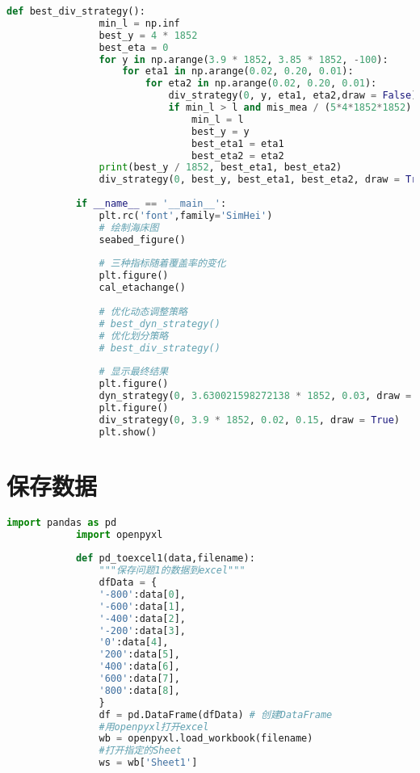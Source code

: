 \documentclass[withoutpreface,bwprint]{cumcmthesis} %
\begin{document}
\begin{appendices}
\begin{lstlisting}[language=python]
            def best_div_strategy():
                min_l = np.inf
                best_y = 4 * 1852
                best_eta = 0
                for y in np.arange(3.9 * 1852, 3.85 * 1852, -100):
                    for eta1 in np.arange(0.02, 0.20, 0.01):
                        for eta2 in np.arange(0.02, 0.20, 0.01):
                            div_strategy(0, y, eta1, eta2,draw = False)
                            if min_l > l and mis_mea / (5*4*1852*1852) < 0.05:
                                min_l = l
                                best_y = y
                                best_eta1 = eta1
                                best_eta2 = eta2
                print(best_y / 1852, best_eta1, best_eta2)
                div_strategy(0, best_y, best_eta1, best_eta2, draw = True)
            
            if __name__ == '__main__':
                plt.rc('font',family='SimHei')
                # 绘制海床图
                seabed_figure()
                
                # 三种指标随着覆盖率的变化
                plt.figure()
                cal_etachange()
            
                # 优化动态调整策略
                # best_dyn_strategy()
                # 优化划分策略
                # best_div_strategy()
            
                # 显示最终结果
                plt.figure()
                dyn_strategy(0, 3.630021598272138 * 1852, 0.03, draw = True)
                plt.figure()
                div_strategy(0, 3.9 * 1852, 0.02, 0.15, draw = True)
                plt.show()
            \end{lstlisting}

            \section{保存数据}

            \begin{lstlisting}[language=python]
            import pandas as pd
            import openpyxl
            
            def pd_toexcel1(data,filename):
                """保存问题1的数据到excel"""
                dfData = { 
                '-800':data[0],
                '-600':data[1],
                '-400':data[2],
                '-200':data[3],
                '0':data[4],
                '200':data[5],
                '400':data[6],
                '600':data[7],
                '800':data[8],
                }
                df = pd.DataFrame(dfData) # 创建DataFrame
                #用openpyxl打开excel
                wb = openpyxl.load_workbook(filename)
                #打开指定的Sheet
                ws = wb['Sheet1']
                

\end{lstlisting}
\end{appendices}
\end{document}
